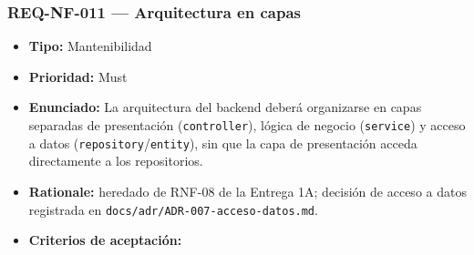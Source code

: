 \documentclass[
  spanish,
]{article}
\providecommand{\tightlist}{%
  \setlength{\itemsep}{0pt}\setlength{\parskip}{0pt}}
\begin{document}
\subsubsection{REQ-NF-011 --- Arquitectura en
capas}\label{req-nf-011-arquitectura-en-capas}

\begin{itemize}
\tightlist
\item
  \textbf{Tipo:} Mantenibilidad
\item
  \textbf{Prioridad:} Must
\item
  \textbf{Enunciado:} La arquitectura del backend deberá organizarse en
  capas separadas de presentación (\texttt{controller}), lógica de
  negocio (\texttt{service}) y acceso a datos
  (\texttt{repository}/\texttt{entity}), sin que la capa de presentación
  acceda directamente a los repositorios.
\item
  \textbf{Rationale:} heredado de RNF-08 de la Entrega 1A; decisión de
  acceso a datos registrada en
  \texttt{docs/\allowbreak{}adr/\allowbreak{}ADR-\allowbreak{}007-\allowbreak{}acceso-\allowbreak{}datos.\allowbreak{}md}.
\item
  \textbf{Criterios de aceptación:}


\end{itemize}
\end{document}

